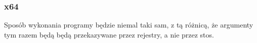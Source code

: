 \subsubsection{x64}

Sposób wykonania programy będzie niemal taki sam, z tą różnicą, że argumenty tym razem będą będą przekazywane przez rejestry, a nie przez stos.







